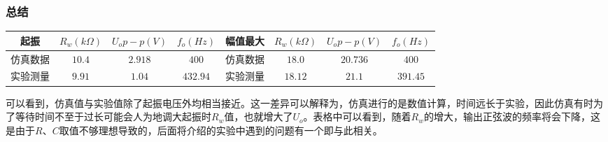 \documentclass[12pt,a4paper]{article}
\begin{document}
\begin{spacing}{1.3}
\subsubsection{总结}
\begin{table}[H]
\centering
\begin{tabular}{|c|c|c|c||c|c|c|c|}
\hline 
起振&$R_{w}(k\Omega)$ & $U_op-p(V)$ & $f_o(Hz)$ &幅值最大&$R_{w}(k\Omega)$ & $U_op-p(V)$ & $f_o(Hz)$\\ \hline 
仿真数据&$10.4$ & $2.918$ & $400$ &仿真数据&$18.0$ & $20.736$ & $400$ \\ \hline
实验测量&$9.91$& $1.04$ &  $432.94$& 实验测量&$18.12$& $21.1$ &  $391.45$\\ \hline 
\end{tabular} 
\end{table}
可以看到，仿真值与实验值除了起振电压外均相当接近。这一差异可以解释为，仿真进行的是数值计算，时间远长于实验，因此仿真有时为了等待时间不至于过长可能会人为地调大起振时$R_w$值，也就增大了$U_o$。表格中可以看到，随着$R_w$的增大，输出正弦波的频率将会下降，这是由于$R、C$取值不够理想导致的，后面将介绍的实验中遇到的问题有一个即与此相关。

\end{spacing}
\end{document}
